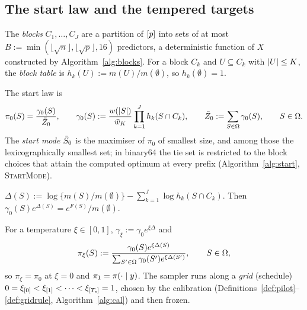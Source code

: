 \subsection{The start law and the tempered targets}

\begin{definition}\label{def:blocks}
The \emph{blocks} $C_1,\dots,C_J$ are a partition of $[p]$ into sets of at most
$B:=\min(\lfloor\sqrt n\rfloor,\lfloor\sqrt p\rfloor,16)$ predictors, a deterministic function of $X$ constructed by
Algorithm~\ref{alg:blocks}. For a block $C_k$ and $U\subseteq C_k$ with $\lvert U\rvert\le K$, the \emph{block table} is
$h_k(U):=m(U)/m(\emptyset)$, so $h_k(\emptyset)=1$.
\end{definition}

\begin{definition}\label{def:startlaw}
The start law is
\begin{equation}\label{eq:startlaw}
  \pi_0(S)=\frac{\gamma_0(S)}{\bar Z_0},\qquad \gamma_0(S):=\frac{w(\lvert S\rvert)}{\bar w_K}\prod_{k=1}^J h_k(S\cap C_k),\qquad
  \bar Z_0:=\sum_{S\in\Omega}\gamma_0(S),\qquad S\in\Omega .
\end{equation}
The \emph{start mode} $\tilde S_0$ is the maximiser of $\pi_0$ of smallest size, and among those the lexicographically smallest
set; in binary64 the tie set is restricted to the block choices that attain the computed optimum at every prefix
(Algorithm~\ref{alg:start}, \textsc{StartMode}).
\end{definition}

\begin{definition}[Discrepancy]\label{def:discrepancy}
$\Delta(S):=\log\{m(S)/m(\emptyset)\}-\sum_{k=1}^J\log h_k(S\cap C_k)$. Then $\gamma_0(S)e^{\Delta(S)}=e^{F(S)}/m(\emptyset)$.
\end{definition}

\begin{definition}\label{def:path}
For a temperature $\xi\in[0,1]$, $\gamma_\xi:=\gamma_0e^{\xi\Delta}$ and
\begin{equation}\label{eq:path}
  \pi_\xi(S):=\frac{\gamma_0(S)e^{\xi\Delta(S)}}{\sum_{S'\in\Omega}\gamma_0(S')e^{\xi\Delta(S')}},\qquad S\in\Omega,
\end{equation}
so $\pi_\xi=\pi_0$ at $\xi=0$ and $\pi_1=\pi(\cdot\mid y)$. The sampler runs along a \emph{grid} (schedule)
$0=\xi_{[0]}<\xi_{[1]}<\dots<\xi_{[T_{\mathrm s}]}=1$, chosen by the calibration (Definitions~\ref{def:pilot}--\ref{def:gridrule},
Algorithm~\ref{alg:cal}) and then frozen.
\end{definition}

